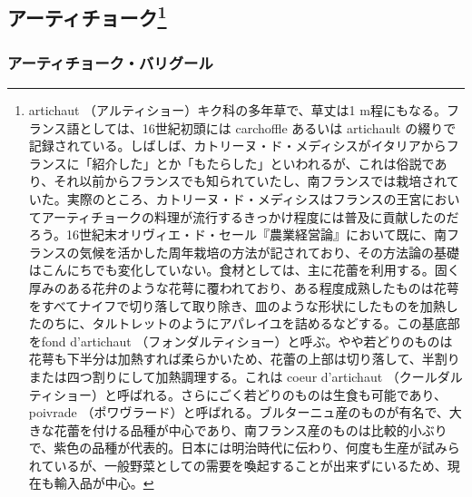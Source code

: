 \href{未、原文対照チェック}{} \href{未、日本語表現校正}{}
\href{未、その他修正}{} \href{未、原稿最終校正}{}

\begin{Main}

\hypertarget{artichauts}{%
\subsection[アーティチョーク]{\texorpdfstring{アーティチョーク\footnote{artichaut
  （アルティショー）キク科の多年草で、草丈は1
  m程にもなる。フランス語としては、16世紀初頭には carchoffle あるいは
  artichault
  の綴りで記録されている。しばしば、カトリーヌ・ド・メディシスがイタリアからフランスに「紹介した」とか「もたらした」といわれるが、これは俗説であり、それ以前からフランスでも知られていたし、南フランスでは栽培されていた。実際のところ、カトリーヌ・ド・メディシスはフランスの王宮においてアーティチョークの料理が流行するきっかけ程度には普及に貢献したのだろう。16世紀末オリヴィエ・ド・セール『農業経営論』において既に、南フランスの気候を活かした周年栽培の方法が記されており、その方法論の基礎はこんにちでも変化していない。食材としては、主に花蕾を利用する。固く厚みのある花弁のような花萼に覆われており、ある程度成熟したものは花萼をすべてナイフで切り落して取り除き、皿のような形状にしたものを加熱したのちに、タルトレットのようにアパレイユを詰めるなどする。この基底部をfond
  d'artichaut
  （フォンダルティショー）と呼ぶ。やや若どりのものは花萼も下半分は加熱すれば柔らかいため、花蕾の上部は切り落して、半割りまたは四つ割りにして加熱調理する。これは
  coeur d'artichaut
  （クールダルティショー）と呼ばれる。さらにごく若どりのものは生食も可能であり、poivrade
  （ポワヴラード）と呼ばれる。ブルターニュ産のものが有名で、大きな花蕾を付ける品種が中心であり、南フランス産のものは比較的小ぶりで、紫色の品種が代表的。日本には明治時代に伝わり、何度も生産が試みられているが、一般野菜としての需要を喚起することが出来ずにいるため、現在も輸入品が中心。}}{アーティチョーク}}\label{artichauts}}


\end{Main}

\begin{recette}

\hypertarget{artichauts-a-la-barigoule}{%
\subsubsection{アーティチョーク・バリグール}\label{artichauts-a-la-barigoule}}




\end{recette}
